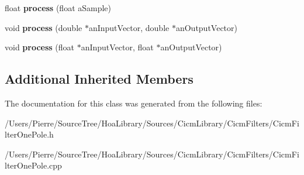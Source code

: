 \begin{DoxyCompactItemize}
\item 
\hypertarget{class_filter_one_pole_ad558f13f57747ecddcf0d652f25549f6}{float {\bfseries process} (float a\-Sample)}\label{class_filter_one_pole_ad558f13f57747ecddcf0d652f25549f6}

\item 
\hypertarget{class_filter_one_pole_ae776545e9f8dae0cf206db64a11e69a6}{void {\bfseries process} (double $\ast$an\-Input\-Vector, double $\ast$an\-Output\-Vector)}\label{class_filter_one_pole_ae776545e9f8dae0cf206db64a11e69a6}

\item 
\hypertarget{class_filter_one_pole_aac18838d9d423c8053323463106caa4e}{void {\bfseries process} (float $\ast$an\-Input\-Vector, float $\ast$an\-Output\-Vector)}\label{class_filter_one_pole_aac18838d9d423c8053323463106caa4e}

\end{DoxyCompactItemize}
\subsection*{Additional Inherited Members}


The documentation for this class was generated from the following files\-:\begin{DoxyCompactItemize}
\item 
/\-Users/\-Pierre/\-Source\-Tree/\-Hoa\-Library/\-Sources/\-Cicm\-Library/\-Cicm\-Filters/Cicm\-Filter\-One\-Pole.\-h\item 
/\-Users/\-Pierre/\-Source\-Tree/\-Hoa\-Library/\-Sources/\-Cicm\-Library/\-Cicm\-Filters/Cicm\-Filter\-One\-Pole.\-cpp\end{DoxyCompactItemize}
